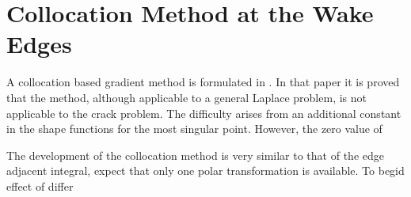 \chapter{Collocation Method at the Wake Edges}
\label{append:collocation}

\setcounter{equation}{0}

A collocation based gradient method is formulated in \citet[sec. 5]{Gray:2004:SJoSC}. In that
paper it is proved that the method, although applicable to a general Laplace problem, is not
applicable to the crack problem. The difficulty arises from an additional constant in the shape
functions for the most singular point. However, the zero value of 

% 

The development of the collocation method is very similar to that of the edge adjacent integral,
expect that only one polar transformation is available. To begid
effect of
differ


